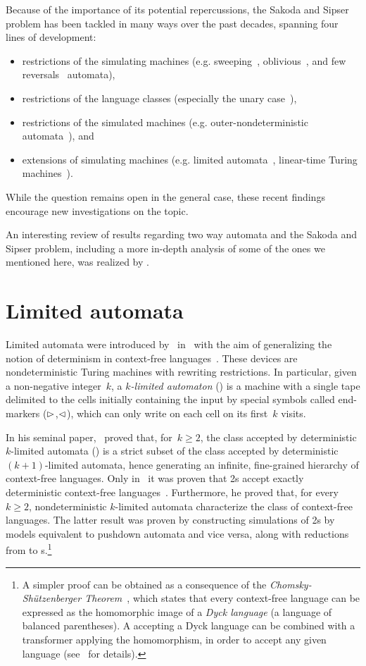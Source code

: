 Because of the importance of its potential repercussions, the Sakoda and Sipser problem has been tackled in many ways over the past decades, spanning four lines of development:
\begin{itemize}
	\item restrictions of the simulating machines (e.g. sweeping~\cite{Sip80}, oblivious~\cite{HroSch03}, and few reversals~\cite{Kap13} automata),
	\item restrictions of the language classes (especially the unary case~\cite{GefMer+07}),
	\item restrictions of the simulated machines (e.g. outer-nondeterministic automata~\cite{GefGui+14,KapPig15}), and
	\item extensions of simulating machines (e.g. limited automata~\cite{PigPis14,PigPri19,GuiPri19,PigPri+22}, linear-time Turing machines~\cite{Pru14,GuiPig+18,Hen65,GuiPig+23,Har68}).
\end{itemize}
While the question remains open in the general case, these recent findings encourage new investigations on the topic.

An interesting review of results regarding two way automata and the Sakoda and Sipser problem, including a more in-depth analysis of some of the ones we mentioned here, was realized by .


\section{Limited automata}
Limited automata were introduced by~ in~\citeyear{Hib67} with the aim of generalizing the notion of determinism in context-free languages~\cite{Hib67}.
These devices are nondeterministic Turing machines with rewriting restrictions.
In particular, given a non-negative integer~$k$, a \emph{$k$-limited automaton} (\kLA) is a machine with a single tape delimited to the cells initially containing the input by special symbols called end-markers ($\rhd$,$\lhd$), which can only write on each cell on its first~$k$ visits.

In his seminal paper,~\citeauthor{Hib67} proved that, for~$k\ge2$, the class accepted by deterministic $k$-limited automata (\kDLAs) is a strict subset of the class accepted by deterministic~$(k+1)$-limited automata, hence generating an infinite, fine-grained hierarchy of context-free languages.
Only in~\citeyear{PigPis15} it was proven that \DLA2s accept exactly deterministic context-free languages~\cite{PigPis15}.
Furthermore, he proved that, for every~$k\ge2$, nondeterministic $k$-limited automata characterize the class of context-free languages.
The latter result was proven by constructing simulations of \LA2s by models equivalent to pushdown automata and vice versa, along with reductions from \kLAs to s.\footnote{%
	A simpler proof can be obtained as a consequence of the \emph{Chomsky-Shützenberger Theorem}~\cite{ChoSch63}, which states that every context-free language can be expressed as the homomorphic image of a \emph{Dyck language} (a language of balanced parentheses).
	A  accepting a Dyck language can be combined with a transformer applying the homomorphism, in order to accept any given language (see~\cite{Pig19} for details).}

